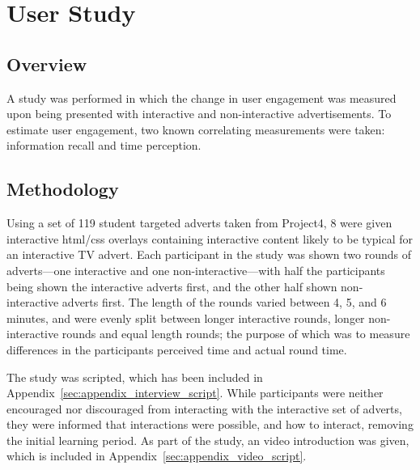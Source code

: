 \section{User Study}
	\subsection{Overview}
	A study was performed in which the change in user engagement was measured upon being presented with interactive and non-interactive advertisements. To estimate user engagement, two known correlating measurements were taken: information recall\citep{} and time perception\citep{yahoo-intrusive-advertising}.

	\subsection{Methodology}
	Using a set of 119 student targeted adverts taken from Project4, 8 were given interactive html/css overlays containing interactive content likely to be typical for an interactive TV advert. Each participant in the study was shown two rounds of adverts---one interactive and one non-interactive---with half the participants being shown the interactive adverts first, and the other half shown non-interactive adverts first. The length of the rounds varied between 4, 5, and 6 minutes, and were evenly split between longer interactive rounds, longer non-interactive rounds and equal length rounds; the purpose of which was to measure differences in the participants perceived time and actual round time. 

	The study was scripted, which has been included in Appendix~\ref{sec:appendix_interview_script}. While participants were neither encouraged nor discouraged from interacting with the interactive set of adverts, they were informed that interactions were possible, and how to interact, removing the initial learning period. As part of the study, an video introduction was given, which is included in Appendix~\ref{sec:appendix_video_script}.

